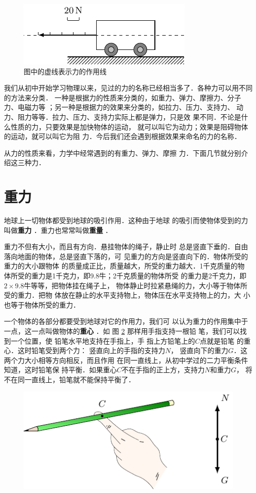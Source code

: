 \begin{figure} [htp]\centering
\includegraphics{fig/A/1-1.pdf} 
\caption{图中的虚线表示力的作用线} \label{fig_A_1-1} 
\end{figure} 

我们从初中开始学习物理以来，见过的力的名称已经相当多了．各种力可以用不同的方法来分类．
一种是根据力的性质来分类的，如重力、弹力、摩擦力、分子力、电磁力等
；另一种是根据力的效果来分类的，如拉力、压力、支持力、
动力、阻力等等．拉力、压力、支持力实际上都是弹力，只是效
果不同．不论是什么性质的力，只要效果是加快物体的运动，
就可以叫它为动力；效果是阻碍物体的运动，就可以叫它为阻
力．今后我们还会遇到根据效果来命名的力的名称．

    从力的性质来看，力学中经常遇到的有重力、弹力、摩擦
力．下面几节就分别介绍这三种力．


\section{重力} 
    地球上一切物体都受到地球的吸引作用．这种由于地球
的吸引而使物体受到的力叫做\textbf{重力} ．重力也常常叫做\textbf{重量} ．

    重力不但有大小，而且有方向．悬挂物体的绳子，静止时
总是竖直下垂的．自由落向地面的物体，总是竖直下落的，可
见重力的方向是竖直向下的．物体所受的重力的大小跟物体
的质量成正比，质量越大，所受的重力越大．1千克质量的物
体所受的重力是1千克力，即9.8牛；2千克质量的物体所受
的重力是2千克力，即$2\times 9.8$牛等等，把物体挂在绳子上，
物体静止时拉紧悬绳的力，大小等于物体所受的重力．把物
体放在静止的水平支持物上，物体压在水平支持物上的力，大
小也等于物体所受的重力．

    一个物体的各部分都要受到地球对它的作用力，我们可
以认为重力的作用集中于一点，这一点叫做物体的\textbf{重心} ．如
图 \ref{fig_A_1-2} 那样用手指支持一根铅
笔，我们可以找到一个位置，使
铅笔水平地支持在手指上，手
指上方铅笔上的$C$点就是铅笔
的重心．这时铅笔受到两个力：
竖直向上的手指的支持力$N$，
竖直向下的重力$G$．这两个力大小相等方向相反，而且作用
在同一直线上，从初中学过的二力平衡条件知道，这时铅笔保
持平衡．如果重心$C$不在手指的正上方，支持力$N$和重力$G$，
将不在同一直线上，铅笔就不能保持平衡了．
\begin{figure} [htp]
\centering
\includegraphics{fig/A/1-2.pdf} 
\caption{} \label{fig_A_1-2} 
\end{figure} 

